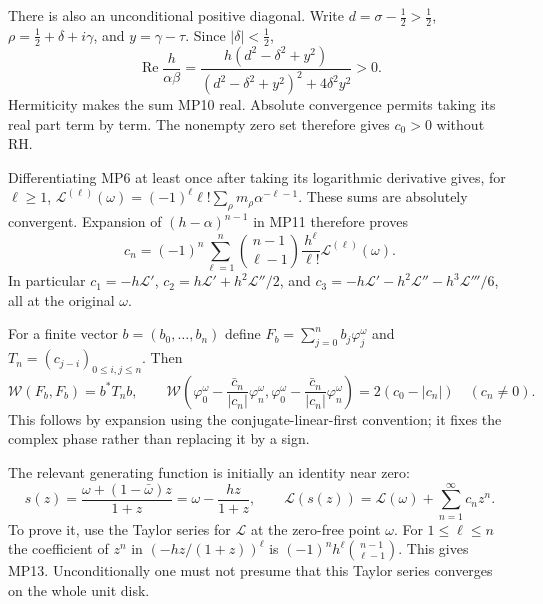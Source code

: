 \documentclass[11pt]{article}
\newcommand{\W}{\mathcal W}
\newcommand{\LL}{\mathscr L}
\newcommand{\Rea}{\operatorname{Re}}
\begin{document}
There is also an unconditional positive diagonal. Write
$d=\sigma-\tfrac12>\tfrac12$, $\rho=\tfrac12+\delta+i\gamma$, and
$y=\gamma-\tau$. Since $|\delta|<\tfrac12$,
\begin{equation}
 \Rea\frac h{\alpha\beta}
 =\frac{h(d^2-\delta^2+y^2)}
        {(d^2-\delta^2+y^2)^2+4\delta^2y^2}>0.
 \tag{MP12}
\end{equation}
Hermiticity makes the sum MP10 real. Absolute convergence permits taking
its real part term by term. The nonempty zero set therefore gives
$c_0>0$ without RH.

Differentiating MP6 at least once after taking its logarithmic derivative
gives, for $\ell\geq1$,
$\LL^{(\ell)}(\omega)=(-1)^\ell\ell!\sum_\rho
m_\rho\alpha^{-\ell-1}$. These sums are absolutely convergent.
Expansion of $(h-\alpha)^{n-1}$ in MP11 therefore proves
\begin{equation}
 c_n=(-1)^n\sum_{\ell=1}^n\binom{n-1}{\ell-1}
               \frac{h^\ell}{\ell!}\LL^{(\ell)}(\omega).
 \tag{MP13}
\end{equation}
In particular $c_1=-h\LL'$, $c_2=h\LL'+h^2\LL''/2$, and
$c_3=-h\LL'-h^2\LL''-h^3\LL'''/6$, all at the original $\omega$.

For a finite vector $b=(b_0,\ldots,b_n)$ define
$F_b=\sum_{j=0}^n b_j\varphi_j^\omega$ and
$T_n=(c_{j-i})_{0\leq i,j\leq n}$. Then
\begin{equation}
 \W(F_b,F_b)=b^*T_nb,\qquad
 \W\left(\varphi_0^\omega-
             \frac{\bar c_n}{|c_n|}\varphi_n^\omega,
          \varphi_0^\omega-
             \frac{\bar c_n}{|c_n|}\varphi_n^\omega\right)
       =2(c_0-|c_n|)\quad(c_n\ne0).
 \tag{MP14}
\end{equation}
This follows by expansion using the conjugate-linear-first convention;
it fixes the complex phase rather than replacing it by a sign.

The relevant generating function is initially an identity near zero:
\begin{equation}
 s(z)=\frac{\omega+(1-\bar\omega)z}{1+z}
     =\omega-\frac{hz}{1+z},\qquad
 \LL(s(z))=\LL(\omega)+\sum_{n=1}^\infty c_n z^n.
 \tag{MP15}
\end{equation}
To prove it, use the Taylor series for $\LL$ at the zero-free point
$\omega$. For $1\leq\ell\leq n$ the coefficient of $z^n$ in
$(-hz/(1+z))^\ell$ is
$(-1)^n h^\ell\binom{n-1}{\ell-1}$. This gives MP13.
Unconditionally one must not presume that this Taylor series converges
on the whole unit disk.
\end{document}
